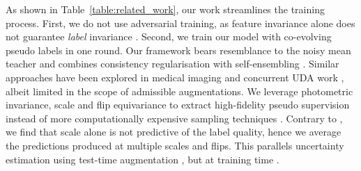 As shown in Table~\ref{table:related_work}, our work streamlines the training process.
First, we do not use adversarial training, as feature invariance alone does not guarantee \textit{label} invariance \cite{JohanssonSR19,0002CZG19}.
Second, we train our model with co-evolving pseudo labels in one round.
Our framework bears resemblance to the noisy mean teacher \cite{XieLHL20} and combines consistency regularisation \cite{BachmanAP14,SajjadiJT16,SohnBCZZRCKL20,XieDHL020} with self-ensembling \cite{LaineA17,tarvainen2017mean}.
Similar approaches have been explored in medical imaging \cite{LiY0FH18,PeroneBBC19} and concurrent UDA work \cite{Wang_Yang_Betke_2021}, albeit limited in the scope of admissible augmentations.
We leverage photometric invariance, scale and flip equivariance \cite{WangZKSC20} to extract high-fidelity pseudo supervision instead of more computationally expensive sampling techniques \cite{KendallG17}.
Contrary to \cite{subhani2020learning}, we find that scale alone is not predictive of the label quality, hence we average the predictions produced at multiple scales and flips.
This parallels uncertainty estimation using test-time augmentation \cite{ayhan2018test}, but at training time \cite{BerthelotCGPOR19}.
